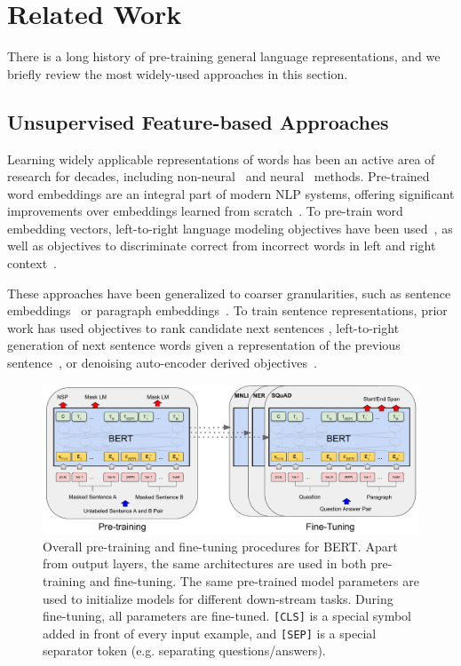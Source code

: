 
\section{Related Work}
There is a long history of pre-training general language representations, and we briefly review the most widely-used approaches in this section.


\subsection{Unsupervised Feature-based Approaches}
Learning widely applicable representations of words has been an active area of research for decades, including non-neural~\cite{brown-etal:1992:_class, ando-zhang:2005, blitzer-mcdonald-pereira:2006:_domain} and neural~\cite{mikolov-etal:2013, pennington-socher-manning:2014:_glove} methods. Pre-trained word embeddings are an integral part of modern NLP systems, offering significant improvements over embeddings learned from scratch~\cite{turian-ratinov-bengio:2010:_word_repres}. To pre-train word embedding vectors, left-to-right language modeling objectives have been used~\cite{minh09}, as well as objectives to  discriminate correct from incorrect words in left and right context~\cite{mikolov-etal:2013}.

These approaches have been generalized to coarser granularities, such as sentence embeddings~\cite{kiros-etal:2015:_skip, logeswaran2018an} or paragraph embeddings~\cite{le-mikolov:2014:_distr}. To train sentence representations, prior work has used objectives to rank candidate next sentences  \cite{DBLP:journals/corr/JerniteBS17, logeswaran2018an},  left-to-right generation of next sentence words given a representation of the previous sentence~\cite{kiros-etal:2015:_skip}, or denoising auto-encoder derived objectives~\cite{hill16}.

%
\begin{figure}[t!]
\begin{center}
\includegraphics[width=1\textwidth]{BERT_Overall.pdf}
\end{center}
\caption{Overall pre-training and fine-tuning procedures for BERT. Apart from output layers, the same architectures are used in both pre-training and fine-tuning. The same pre-trained model parameters are used to initialize models for different down-stream tasks.  During fine-tuning, all parameters are fine-tuned. {\tt [CLS]} is a special symbol added
in front of every input example, and {\tt [SEP]} is a special separator token (e.g. separating  questions/answers).}
\label{fig:bert_overall}
\end{figure}
%



